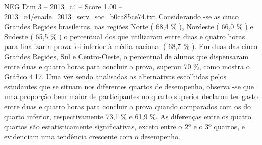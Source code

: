 \begin{textsample}{NEG Dim 3 – 2013\_c4 – Score 1.00 – 2013\_c4/enade\_2013\_serv\_soc\_b0ca85ce74.txt}
Considerando -se as cinco Grandes Regiões brasileiras, nas regiões Norte ( 68,4 \% ), Nordeste ( 66,0 \% ) e Sudeste ( 65,5 \% ) o percentual dos que utilizaram entre duas e quatro horas para finalizar a prova foi inferior à média nacional ( 68,7 \% ).
Em duas das cinco Grandes Regiões, Sul e Centro-Oeste, o percentual de alunos que dispensaram entre duas e quatro horas para concluir a prova, superou 70 \%, como mostra o Gráfico 4.17.
Uma vez sendo analisadas as alternativas escolhidas pelos estudantes que se situam nos diferentes quartos de desempenho, observa -se que uma proporção bem maior de participantes no quarto superior declarou ter gasto entre duas e quatro horas para concluir a prova quando comparados com os do quarto inferior, respectivamente 73,1 \% e 61,9 \%.
As diferenças entre os quatro quartos são estatisticamente significativas, exceto entre o 2º e o 3º quartos, e evidenciam uma tendência crescente com o desempenho.

\end{textsample}
